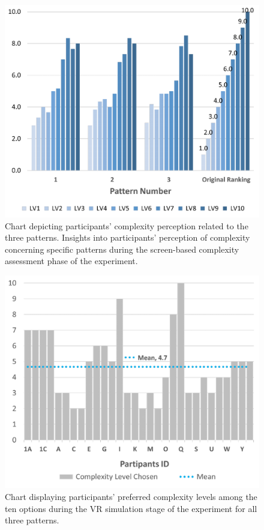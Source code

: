     \begin{figure}[htb]
        \centering
        \includegraphics[width=\linewidth]{Images/ComplexityPerceptionChart}
        \caption{Chart depicting participants' complexity perception related to the three patterns. Insights into participants' perception of complexity concerning specific patterns during the screen-based complexity assessment phase of the experiment.}
        \label{fig:ComplexityPerceptionChart}
    \end{figure}


    \begin{figure}[htb]
        \centering
        \includegraphics[width=\linewidth]{Images/ComplexityLevelChosenChart}
        \caption{Chart displaying participants' preferred complexity levels among the ten options during the VR simulation stage of the experiment for all three patterns.}
        \label{fig:ComplexityLevelChosenChart}
    \end{figure}


